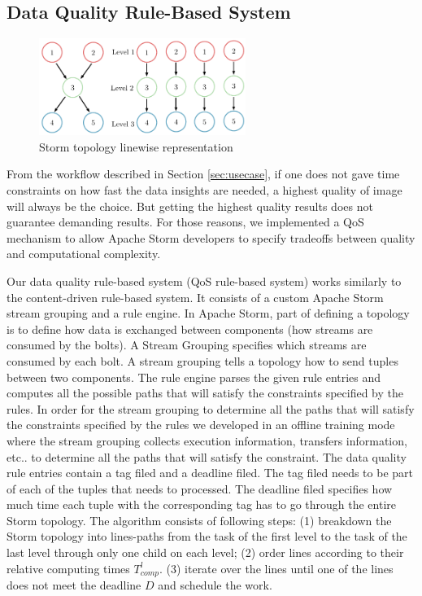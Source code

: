 \subsection{Data Quality Rule-Based System}

\begin{figure}[h!]
  \centering
  \includegraphics[width=0.6\textwidth]{Figures/AlgoImg.pdf}
  \caption{Storm topology linewise representation}
  \label{fig:boat1}
\end{figure}

From the workflow described in Section \ref{sec:usecase}, if one does not gave time constraints on how fast the data insights are needed, a highest quality of   image will always be the choice. But getting the highest quality results does not guarantee demanding results. For those reasons, we implemented a QoS mechanism to allow Apache Storm developers to specify tradeoffs between quality and computational complexity.

Our data quality rule-based system (QoS rule-based system) works similarly to the content-driven rule-based system. It consists of a custom Apache Storm stream grouping and a rule engine. In Apache Storm, part of defining a topology is to define how data is exchanged between components (how streams are consumed by the bolts). A Stream Grouping specifies which streams are consumed by each bolt. A stream grouping tells a topology how to send tuples between two components. The rule engine parses the given rule entries and computes all the possible paths that will satisfy the constraints specified by the rules. In order for the stream grouping to determine all the paths that will satisfy the constraints specified by the rules we developed in an offline training mode where the stream grouping collects execution information, transfers information, etc.. to determine all the paths that will satisfy the constraint. The data quality rule entries contain a tag filed and a deadline filed. The tag filed needs to be part of each of the tuples that needs to processed. The deadline filed specifies how much time each tuple with the corresponding tag has to go through the entire Storm topology. The algorithm consists of following steps: (1) breakdown the Storm topology into lines-paths from the task of the first level to the task of the last level through only one child on each level; (2) order lines according to their relative computing times $T_{comp}^l$. (3) iterate over the lines until one of the lines does not meet the deadline $D$ and schedule the work.

